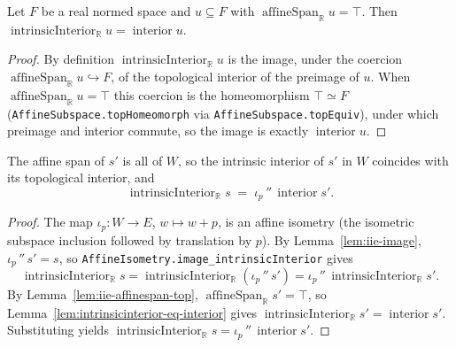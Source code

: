 \begin{lemma}
    \label{lem:intrinsicinterior-eq-interior}
    \leanok
    Let $F$ be a real normed space and $u \subseteq F$ with
    $\operatorname{affineSpan}_{\mathbb R} u = \top$. Then
    $\operatorname{intrinsicInterior}_{\mathbb R} u = \operatorname{interior} u$.
\end{lemma}
\begin{proof}
    By definition $\operatorname{intrinsicInterior}_{\mathbb R} u$ is the image,
    under the coercion $\operatorname{affineSpan}_{\mathbb R} u \hookrightarrow F$,
    of the topological interior of the preimage of $u$. When
    $\operatorname{affineSpan}_{\mathbb R} u = \top$ this coercion is the
    homeomorphism $\top \simeq F$ (\texttt{AffineSubspace.topHomeomorph} via
    \texttt{AffineSubspace.topEquiv}), under which preimage and interior commute,
    so the image is exactly $\operatorname{interior} u$.
\end{proof}

\begin{lemma}
    \label{lem:intrinsic-interior-eq-image}
    \leanok
    The affine span of $s'$ is all of $W$, so the intrinsic interior of $s'$ in
    $W$ coincides with its topological interior, and
    \[
        \operatorname{intrinsicInterior}_{\mathbb R} s
        \;=\; \iota_p\,''\,\operatorname{interior} s' .
    \]
\end{lemma}
\begin{proof}
    The map $\iota_p : W \to E$, $w \mapsto w + p$, is an affine isometry (the
    isometric subspace inclusion followed by translation by $p$). By
    Lemma~\ref{lem:iie-image}, $\iota_p\,''\,s' = s$, so
    \texttt{AffineIsometry.image\_intrinsicInterior} gives
    \[
        \operatorname{intrinsicInterior}_{\mathbb R} s
        = \operatorname{intrinsicInterior}_{\mathbb R}(\iota_p\,''\,s')
        = \iota_p\,''\,\operatorname{intrinsicInterior}_{\mathbb R} s' .
    \]
    By Lemma~\ref{lem:iie-affinespan-top}, $\operatorname{affineSpan}_{\mathbb R} s'
    = \top$, so Lemma~\ref{lem:intrinsicinterior-eq-interior} gives
    $\operatorname{intrinsicInterior}_{\mathbb R} s' = \operatorname{interior} s'$.
    Substituting yields
    $\operatorname{intrinsicInterior}_{\mathbb R} s
    = \iota_p\,''\,\operatorname{interior} s'$.
\end{proof}

